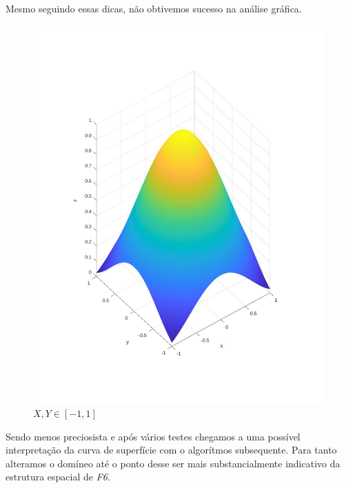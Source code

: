 \documentclass{article}
\begin{document}
\newpage
Mesmo seguindo essas dicas, não obtivemos sucesso na análise gráfica.

\begin{figure}[h!]
\centering
\includegraphics[scale=.5]{images/myplot4.pdf}
\caption{$X,Y \in [-1, 1]$}
\label{fig:plot4_f6}
\end{figure}

Sendo menos preciosista e após vários testes chegamos a uma possível interpretação da curva de superfície com o algorítmos subsequente. Para tanto alteramos o domíneo até o ponto desse ser mais substancialmente indicativo da estrutura espacial de \emph{F6}.


\end{document}
